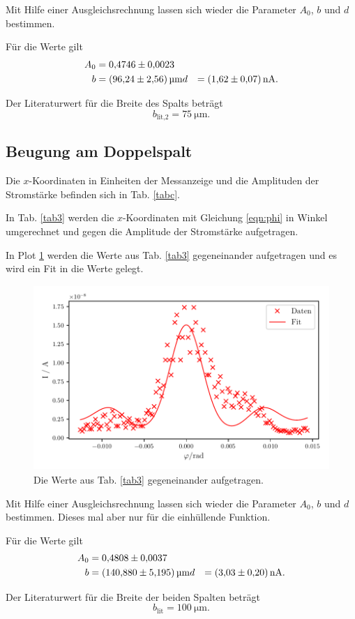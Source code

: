 \noindent Mit Hilfe einer Ausgleichsrechnung lassen sich wieder die Parameter $A_0$, $b$ und $d$ bestimmen. 

\noindent Für die Werte gilt
\begin{align*}
    A_0 &= \num{0.4746 (023)} \\
    b &= \SI{96.24 \pm 2.56}{\micro\meter}
    d &= \SI{1.62(07)}{\nano\ampere}. 
\end{align*}

\noindent Der Literaturwert für die Breite des Spalts beträgt
\begin{equation*}
    b_{\text{lit,2}} = \SI{75}{\micro\meter}.
\end{equation*}


\subsection{Beugung am Doppelspalt}
Die $x$-Koordinaten in Einheiten der Messanzeige und die Amplituden der Stromstärke befinden sich in Tab. \ref{tabc}. 



\noindent In Tab. \ref{tab3} werden die $x$-Koordinaten mit Gleichung \eqref{eqn:phi} in Winkel umgerechnet und gegen die Amplitude der Stromstärke aufgetragen. 



\noindent In Plot \ref{fig:plot3} werden die Werte aus Tab. \ref{tab3} gegeneinander aufgetragen und es wird ein Fit in die Werte gelegt. 

\begin{figure}
    \centering
    \includegraphics[width=12cm, height=7cm]{build/plot3.pdf}
    \caption{Die Werte aus Tab. \ref{tab3} gegeneinander aufgetragen.}
    \label{fig:plot3}
\end{figure}

\noindent Mit Hilfe einer Ausgleichsrechnung lassen sich wieder die Parameter $A_0$, $b$ und $d$ bestimmen. Dieses mal aber nur für die einhüllende Funktion. 

\noindent Für die Werte gilt
\begin{align*}
    A_0 &= \num{0.4808 (037)} \\
    b &= \SI{140.88 \pm 5.195}{\micro\meter}
    d &= \SI{3.03(20)}{\nano\ampere}. 
\end{align*}

\noindent Der Literaturwert für die Breite der beiden Spalten beträgt
\begin{equation*}
    b_{\text{lit}} = \SI{100}{\micro\meter}.
\end{equation*}
